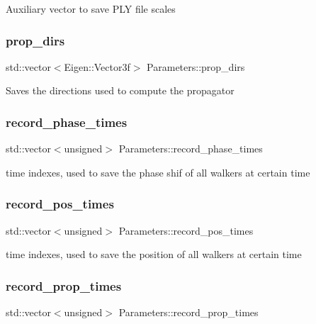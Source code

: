 Auxiliary vector to save P\+LY file scales \mbox{\label{class_parameters_a4bbfed0148cec6e10d0e90d85437a37a}} 
\subsubsection{\texorpdfstring{prop\+\_\+dirs}{prop\_dirs}}
{\footnotesize\ttfamily std\+::vector$<$Eigen\+::\+Vector3f$>$ Parameters\+::prop\+\_\+dirs}

Saves the directions used to compute the propagator \mbox{\label{class_parameters_a559e66b65a2cb4391d1099bf0db6ec44}} 
\subsubsection{\texorpdfstring{record\+\_\+phase\+\_\+times}{record\_phase\_times}}
{\footnotesize\ttfamily std\+::vector$<$unsigned$>$ Parameters\+::record\+\_\+phase\+\_\+times}

time indexes, used to save the phase shif of all walkers at certain time \mbox{\label{class_parameters_a4f884a7effd3a8816c78084ff3c2b202}} 
\subsubsection{\texorpdfstring{record\+\_\+pos\+\_\+times}{record\_pos\_times}}
{\footnotesize\ttfamily std\+::vector$<$unsigned$>$ Parameters\+::record\+\_\+pos\+\_\+times}

time indexes, used to save the position of all walkers at certain time \mbox{\label{class_parameters_af47bd2eada81c6c581aaa8c70d04c8d6}} 
\subsubsection{\texorpdfstring{record\+\_\+prop\+\_\+times}{record\_prop\_times}}
{\footnotesize\ttfamily std\+::vector$<$unsigned$>$ Parameters\+::record\+\_\+prop\+\_\+times}

